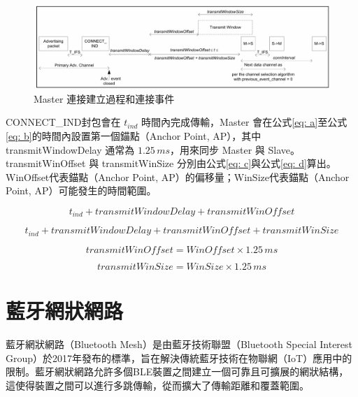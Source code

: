 \begin{ZhChapter}
\begin{figure}[H]
    \centering
    \includegraphics[width = 1\textwidth]{image/Master 連接建立過程和連接事件.png}
    \caption{Master 連接建立過程和連接事件\cite{bluetooth2016core}}
    \label{fig: Master 連接建立過程和連接事件}
\end{figure}

CONNECT\_IND封包會在 $t_{ind}$ 時間內完成傳輸，Master 會在公式\ref{eq: a}至公式\ref{eq: b}的時間內設置第一個錨點（Anchor Point, AP），其中 transmitWindowDelay 通常為 $1.25\,{ms}$，用來同步 Master 與 Slave。transmitWinOffset 與 transmitWinSize 分別由公式\ref{eq: c}與公式\ref{eq: d}算出。WinOffset代表錨點（Anchor Point, AP）的偏移量；WinSize代表錨點（Anchor Point, AP）可能發生的時間範圍\cite{10.1145/3412382.3458271}。

\begin{equation}
t_{ind} + transmitWindowDelay + transmitWinOffset
\label{eq: a}
\end{equation}

\begin{equation}
t_{ind} + transmitWindowDelay + transmitWinOffset + transmitWinSize
\label{eq: b}
\end{equation}

\begin{equation}
transmitWinOffset = WinOffset \times 1.25\, ms
\label{eq: c}
\end{equation}

\begin{equation}
transmitWinSize = WinSize \times 1.25\, ms 
\label{eq: d}
\end{equation}

\section{藍牙網狀網路}

藍牙網狀網路（Bluetooth Mesh）是由藍牙技術聯盟（Bluetooth Special Interest Group）於2017年發布的標準，旨在解決傳統藍牙技術在物聯網（IoT）應用中的限制。藍牙網狀網路允許多個BLE裝置之間建立一個可靠且可擴展的網狀結構，這使得裝置之間可以進行多跳傳輸，從而擴大了傳輸距離和覆蓋範圍。


\end{ZhChapter}
